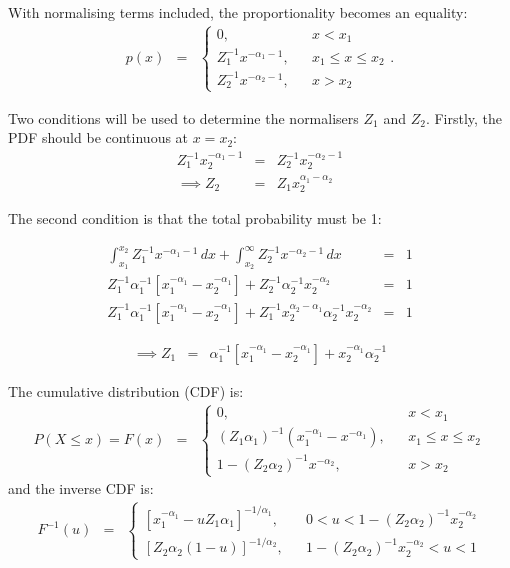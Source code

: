 \documentclass[letterpaper, 11pt]{article}
\begin{document}
With normalising terms included, the proportionality becomes an equality:
\begin{eqnarray}
p(x) &=&
\left\{
\begin{array}{lcr}
0, & & x < x_1 \\
Z_1^{-1}x^{-\alpha_1 - 1}, & & x_1 \leq x \leq x_2 \\
Z_2^{-1}x^{-\alpha_2 - 1}, & & x > x_2
\end{array}
\right.
.
\end{eqnarray}

Two conditions will be used to determine the normalisers $Z_1$ and $Z_2$.
Firstly, the PDF should be continuous at $x=x_2$:
\begin{eqnarray}
Z_1^{-1}x_2^{-\alpha_1 - 1} &=& Z_2^{-1}x_2^{-\alpha_2 - 1}\\
\implies
Z_2 &=& Z_1x_2^{\alpha_1-\alpha_2}
\end{eqnarray}

The second condition is that the total probability must be 1:

\begin{eqnarray}
\int_{x_1}^{x_2} Z_1^{-1} x^{-\alpha_1 - 1} \, dx
+
\int_{x_2}^\infty Z_2^{-1} x^{-\alpha_2 - 1} \, dx
&=& 1 \\
Z_1^{-1}\alpha_1^{-1}\left[x_1^{-\alpha_1} - x_2^{-\alpha_1}\right]
+
Z_2^{-1}\alpha_2^{-1}x_2^{-\alpha_2}
&=& 1 \\
Z_1^{-1}\alpha_1^{-1}\left[x_1^{-\alpha_1} - x_2^{-\alpha_1}\right]
+
Z_1^{-1}x_2^{\alpha_2-\alpha_1}\alpha_2^{-1}x_2^{-\alpha_2}
&=& 1
\end{eqnarray}

\begin{eqnarray}
\implies
Z_1 &=& \alpha_1^{-1}\left[x_1^{-\alpha_1} - x_2^{-\alpha_1}\right]
+
x_2^{-\alpha_1}\alpha_2^{-1}
\end{eqnarray}

The cumulative distribution (CDF) is:
\begin{eqnarray}
P(X \leq x) = F(x) &=&
\left\{
\begin{array}{lcr}
0, & & x < x_1 \\
(Z_1\alpha_1)^{-1}\left(x_1^{-\alpha_1} - x^{-\alpha_1}\right), & & x_1 \leq x \leq x_2 \\
1 - (Z_2\alpha_2)^{-1}x^{-\alpha_2}, & & x > x_2
\end{array}
\right.
\end{eqnarray}
and the inverse CDF is:
\begin{eqnarray}
F^{-1}(u) &=&
\left\{
\begin{array}{lcr}
\left[x_1^{-\alpha_1} - uZ_1\alpha_1\right]^{-1/\alpha_1}, & & 0 < u < 1 - (Z_2\alpha_2)^{-1}x_2^{-\alpha_2}\\
\left[Z_2\alpha_2(1-u)\right]^{-1/\alpha_2},& & 1 - (Z_2\alpha_2)^{-1}x_2^{-\alpha_2}< u < 1
\end{array}
\right.
\end{eqnarray}
\end{document}
